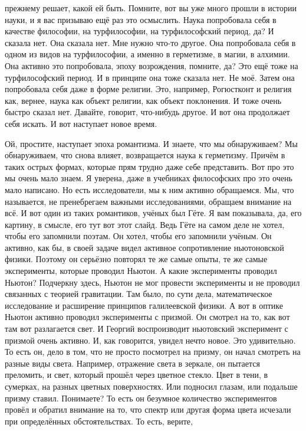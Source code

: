 прежнему решает, какой ей быть. Помните, вот вы уже много прошли в истории
науки, и я вас призываю ещё раз это осмыслить. Наука попробовала себя в качестве
философии, на турфилософии, на турфилософский период, да? И сказала нет. Она
сказала нет. Мне нужно что-то другое. Она попробовала себя в одном из видов на
турфилософии, а именно в герметизме, в магии, в алхимии. Она активно это
попробовала, эпоху возрождения, помните, да? Это ещё тоже на турфилософский
период. И в принципе она тоже сказала нет. Не моё. Затем она попробовала себя
даже в форме религии. Это, например, Рогюстконт и религия как, вернее, наука как
объект религии, как объект поклонения. И тоже очень быстро сказал нет. Давайте,
говорит, что-нибудь другое. И вот она продолжает себя искать. И вот наступает
новое время. 

Ой, простите, наступает эпоха романтизма. И знаете, что мы
обнаруживаем? Мы обнаруживаем, что снова влияет, возвращается наука к
герметизму. Причём в таких острых формах, которые прям трудно даже себе
представить. Вот про это мы очень мало знаем. Я уверена, даже в учебниках
философских про это очень мало написано. Но есть исследователи, мы к ним активно
обращаемся. Мы, что называется, не пренебрегаем важными исследованиями, обращаем
внимание на всё. И вот один из таких романтиков, учёных был Гёте. Я вам
показывала, да, его картину, в смысле, его тут вот этот слайд. Ведь Гёте на
самом деле не хотел, чтобы его запомнили поэтам. Он хотел, чтобы его запомнили
учёным. Он активно, как бы, в своей задаче видел активное сопротивление
ньютоновской физики. Поэтому он серьёзно повторял те же самые опыты, те же самые
эксперименты, которые проводил Ньютон. А какие эксперименты проводил Ньютон?
Подчеркну здесь, Ньютон не мог провести эксперименты и не проводил связанных с
теорией гравитации. Там было, по сути дела, математическое исследование и
расширение принципов галилеевской физики. А вот в оптике Ньютон активно проводил
эксперименты с призмой. Он смотрел на то, как вот там вот разлагается свет. И
Георгий воспроизводит ньютовский эксперимент с призмой очень активно. И, как
говорится, увидел нечто новое. Это удивительно. То есть он, дело в том, что не
просто посмотрел на призму, он начал смотреть на разные виды света. Например,
отражение света в зеркале, он пытается преломить, и свет, который прошёл через
цветное стекло. Цвет в тени, в сумерках, на разных цветных поверхностях. Или
подносил глазам, или подальше призму ставил. Понимаете? То есть он безумное
количество экспериментов провёл и обратил внимание на то, что спектр или другая
форма цвета исчезали при определённых обстоятельствах. То есть, верите,
